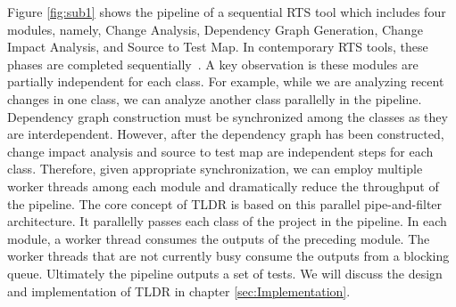 \begin{table}[b]
\centering
  \caption{Categorization of RTS Techniques}
  \label{comparison}
\end{table}%


Figure \ref{fig:sub1} shows the pipeline of a sequential RTS tool which includes four modules, namely, Change Analysis, Dependency Graph Generation, Change Impact Analysis, and Source to Test Map. In contemporary RTS tools, these phases are completed sequentially~\cite{ekstazi, starts, hyrts, faulttracer}. A key observation is these modules are partially independent for each class. For example, while we are analyzing recent changes in one class, we can analyze another class parallelly in the pipeline. Dependency graph construction must be synchronized among the classes as they are interdependent. However, after the dependency graph has been constructed, change impact analysis and source to test map are independent steps for each class. Therefore, given appropriate synchronization, we can employ multiple worker threads among each module and dramatically reduce the throughput of the pipeline. The core concept of TLDR is based on this parallel pipe-and-filter architecture. It parallelly passes each class of the project in the pipeline. In each module, a worker thread consumes the outputs of the preceding module. The worker threads that are not currently busy consume the outputs from a blocking queue. Ultimately the pipeline outputs a set of tests. We will discuss the design and implementation of TLDR in chapter \ref{sec:Implementation}.   

